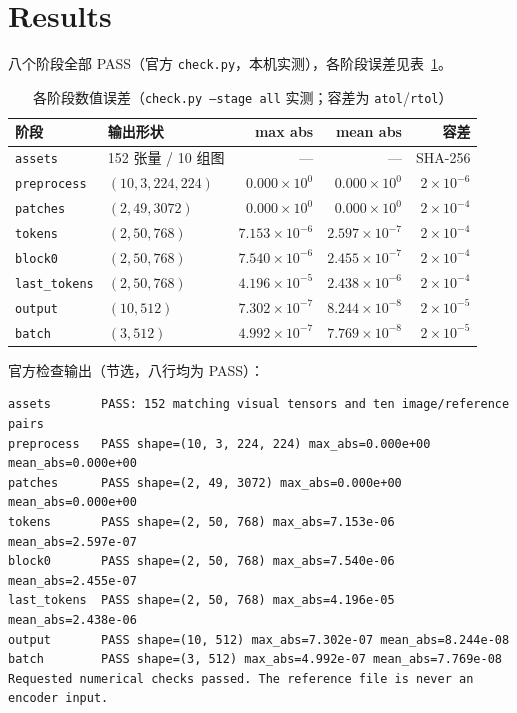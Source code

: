 \documentclass[a4paper,12pt]{article}
\begin{document}
\section{Results}

八个阶段全部 PASS（官方 \texttt{check.py}，本机实测），各阶段误差见表~\ref{tab:err}。

\begin{table}[H]
\centering
\caption{各阶段数值误差（\texttt{check.py --stage all} 实测；容差为 \texttt{atol}/\texttt{rtol}）}
\label{tab:err}
\small
\begin{tabular}{llrrr}
\toprule
阶段 & 输出形状 & max abs & mean abs & 容差 \\
\midrule
\texttt{assets}      & 152 张量 / 10 组图 & --- & --- & SHA-256 \\
\texttt{preprocess}  & $(10,3,224,224)$   & $0.000\times10^{0}$ & $0.000\times10^{0}$ & $2\times10^{-6}$ \\
\texttt{patches}     & $(2,49,3072)$      & $0.000\times10^{0}$ & $0.000\times10^{0}$ & $2\times10^{-4}$ \\
\texttt{tokens}      & $(2,50,768)$       & $7.153\times10^{-6}$ & $2.597\times10^{-7}$ & $2\times10^{-4}$ \\
\texttt{block0}      & $(2,50,768)$       & $7.540\times10^{-6}$ & $2.455\times10^{-7}$ & $2\times10^{-4}$ \\
\texttt{last\_tokens}& $(2,50,768)$       & $4.196\times10^{-5}$ & $2.438\times10^{-6}$ & $2\times10^{-4}$ \\
\texttt{output}      & $(10,512)$         & $7.302\times10^{-7}$ & $8.244\times10^{-8}$ & $2\times10^{-5}$ \\
\texttt{batch}       & $(3,512)$          & $4.992\times10^{-7}$ & $7.769\times10^{-8}$ & $2\times10^{-5}$ \\
\bottomrule
\end{tabular}
\end{table}

官方检查输出（节选，八行均为 PASS）：

{\footnotesize
\begin{verbatim}
assets       PASS: 152 matching visual tensors and ten image/reference pairs
preprocess   PASS shape=(10, 3, 224, 224) max_abs=0.000e+00 mean_abs=0.000e+00
patches      PASS shape=(2, 49, 3072) max_abs=0.000e+00 mean_abs=0.000e+00
tokens       PASS shape=(2, 50, 768) max_abs=7.153e-06 mean_abs=2.597e-07
block0       PASS shape=(2, 50, 768) max_abs=7.540e-06 mean_abs=2.455e-07
last_tokens  PASS shape=(2, 50, 768) max_abs=4.196e-05 mean_abs=2.438e-06
output       PASS shape=(10, 512) max_abs=7.302e-07 mean_abs=8.244e-08
batch        PASS shape=(3, 512) max_abs=4.992e-07 mean_abs=7.769e-08
Requested numerical checks passed. The reference file is never an encoder input.
\end{verbatim}
}
\end{document}
